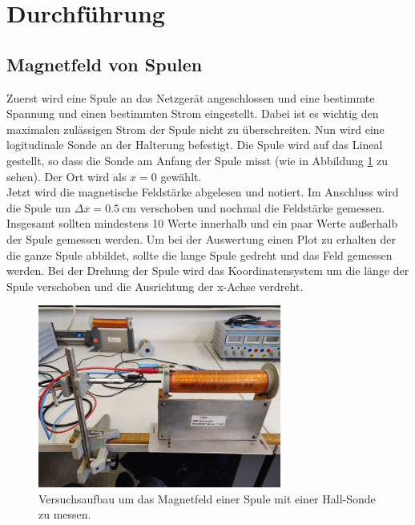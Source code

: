 \section{Durchführung}
\label{sec:Durchführung}
\subsection{Magnetfeld von Spulen}
Zuerst wird eine Spule an das Netzgerät angeschlossen und eine bestimmte
Spannung und einen bestimmten Strom eingestellt. Dabei ist es wichtig den maximalen
zulässigen Strom der Spule nicht zu überschreiten.
Nun wird eine logitudinale Sonde an der Halterung befestigt. Die Spule wird auf das Lineal gestellt, so dass
die Sonde am Anfang der Spule misst (wie in Abbildung \ref{fig:spule_lang} zu sehen). Der Ort wird als $x=0$ gewählt.\\
Jetzt wird die magnetische Feldstärke abgelesen und notiert. Im Anschluss wird die Spule um $\Delta x = \SI{0.5}{\cm}$ verschoben und
nochmal die Feldstärke gemessen. Insgesamt sollten mindestens 10 Werte innerhalb und ein paar Werte außerhalb der Spule gemessen werden.
Um bei der Auswertung einen Plot zu erhalten der die ganze Spule abbildet, sollte die lange Spule gedreht und das Feld gemessen werden.
Bei der Drehung der Spule wird das Koordinatensystem um die länge der Spule verschoben und die Ausrichtung der x-Achse verdreht.
\begin{figure}
    \centering
    \includegraphics[height=6cm]{content/spule_lang.jpg}
    \caption{Versuchsaufbau um das Magnetfeld einer Spule mit einer Hall-Sonde zu messen.}
    \label{fig:spule_lang}
\end{figure}
\FloatBarrier

